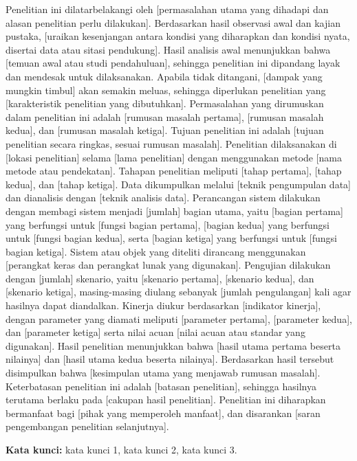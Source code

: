 \begin{abstrak}
Penelitian ini dilatarbelakangi oleh [permasalahan utama yang dihadapi dan alasan penelitian perlu dilakukan]. Berdasarkan hasil observasi awal dan kajian pustaka, [uraikan kesenjangan antara kondisi yang diharapkan dan kondisi nyata, disertai data atau sitasi pendukung]. Hasil analisis awal menunjukkan bahwa [temuan awal atau studi pendahuluan], sehingga penelitian ini dipandang layak dan mendesak untuk dilaksanakan. Apabila tidak ditangani, [dampak yang mungkin timbul] akan semakin meluas, sehingga diperlukan penelitian yang [karakteristik penelitian yang dibutuhkan]. Permasalahan yang dirumuskan dalam penelitian ini adalah [rumusan masalah pertama], [rumusan masalah kedua], dan [rumusan masalah ketiga]. Tujuan penelitian ini adalah [tujuan penelitian secara ringkas, sesuai rumusan masalah]. Penelitian dilaksanakan di [lokasi penelitian] selama [lama penelitian] dengan menggunakan metode [nama metode atau pendekatan]. Tahapan penelitian meliputi [tahap pertama], [tahap kedua], dan [tahap ketiga]. Data dikumpulkan melalui [teknik pengumpulan data] dan dianalisis dengan [teknik analisis data]. Perancangan sistem dilakukan dengan membagi sistem menjadi [jumlah] bagian utama, yaitu [bagian pertama] yang berfungsi untuk [fungsi bagian pertama], [bagian kedua] yang berfungsi untuk [fungsi bagian kedua], serta [bagian ketiga] yang berfungsi untuk [fungsi bagian ketiga]. Sistem atau objek yang diteliti dirancang menggunakan [perangkat keras dan perangkat lunak yang digunakan]. Pengujian dilakukan dengan [jumlah] skenario, yaitu [skenario pertama], [skenario kedua], dan [skenario ketiga], masing-masing diulang sebanyak [jumlah pengulangan] kali agar hasilnya dapat diandalkan. Kinerja diukur berdasarkan [indikator kinerja], dengan parameter yang diamati meliputi [parameter pertama], [parameter kedua], dan [parameter ketiga] serta nilai acuan [nilai acuan atau standar yang digunakan]. Hasil penelitian menunjukkan bahwa [hasil utama pertama beserta nilainya] dan [hasil utama kedua beserta nilainya]. Berdasarkan hasil tersebut disimpulkan bahwa [kesimpulan utama yang menjawab rumusan masalah]. Keterbatasan penelitian ini adalah [batasan penelitian], sehingga hasilnya terutama berlaku pada [cakupan hasil penelitian]. Penelitian ini diharapkan bermanfaat bagi [pihak yang memperoleh manfaat], dan disarankan [saran pengembangan penelitian selanjutnya].

\textbf{Kata kunci:} kata kunci 1, kata kunci 2, kata kunci 3.
\end{abstrak}

